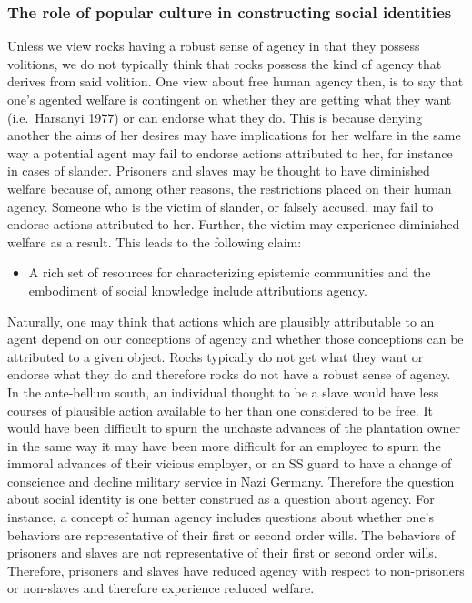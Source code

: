 \documentclass[
  letterpaper,
  DIV=11,
  numbers=noendperiod]{scrartcl}
\providecommand{\tightlist}{%
  \setlength{\itemsep}{0pt}\setlength{\parskip}{0pt}}
\theoremstyle{remark}
\begin{document}
\subsubsection{The role of popular culture in constructing social
identities}\label{the-role-of-popular-culture-in-constructing-social-identities}

Unless we view rocks having a robust sense of agency in that they
possess volitions, we do not typically think that rocks possess the kind
of agency that derives from said volition. One view about free human
agency then, is to say that one's agented welfare is contingent on
whether they are getting what they want (i.e.~Harsanyi 1977) or can
endorse what they do. This is because denying another the aims of her
desires may have implications for her welfare in the same way a
potential agent may fail to endorse actions attributed to her, for
instance in cases of slander. Prisoners and slaves may be thought to
have diminished welfare because of, among other reasons, the
restrictions placed on their human agency. Someone who is the victim of
slander, or falsely accused, may fail to endorse actions attributed to
her. Further, the victim may experience diminished welfare as a result.
This leads to the following claim:

\begin{itemize}
\tightlist
\item
  A rich set of resources for characterizing epistemic communities and
  the embodiment of social knowledge include attributions agency.
\end{itemize}

Naturally, one may think that actions which are plausibly attributable
to an agent depend on our conceptions of agency and whether those
conceptions can be attributed to a given object. Rocks typically do not
get what they want or endorse what they do and therefore rocks do not
have a robust sense of agency. In the ante-bellum south, an individual
thought to be a slave would have less courses of plausible action
available to her than one considered to be free. It would have been
difficult to spurn the unchaste advances of the plantation owner in the
same way it may have been more difficult for an employee to spurn the
immoral advances of their vicious employer, or an SS guard to have a
change of conscience and decline military service in Nazi Germany.
Therefore the question about social identity is one better construed as
a question about agency. For instance, a concept of human agency
includes questions about whether one's behaviors are representative of
their first or second order wills. The behaviors of prisoners and slaves
are not representative of their first or second order wills. Therefore,
prisoners and slaves have reduced agency with respect to non-prisoners
or non-slaves and therefore experience reduced welfare.
\end{document}
